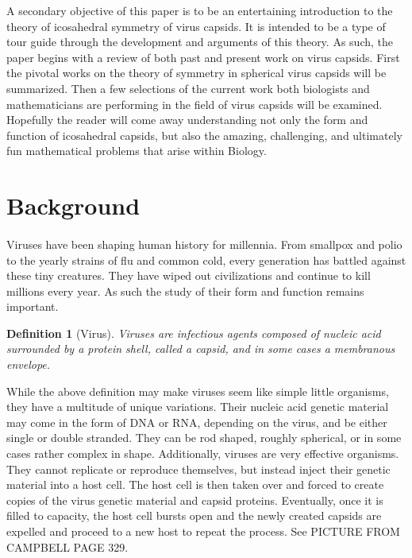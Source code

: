 \documentclass[12pt,letter]{article}
\newtheorem*{definition*}{Definition}
\begin{document}
A secondary objective of this paper is to be an entertaining introduction to the theory of icosahedral symmetry of virus capsids. It is intended to be a type of tour guide through the development and arguments of this theory. As such, the paper begins with a review of both past and present work on virus capsids. First the pivotal works on the theory of symmetry in spherical virus capsids will be summarized. Then a few selections of the current work both biologists and mathematicians are performing in the field of virus capsids will be examined. Hopefully the reader will come away understanding not only the form and function of icosahedral capsids, but also the amazing, challenging, and ultimately fun mathematical problems that arise within Biology. \\

\section{Background} %

\paragraph{}
Viruses have been shaping human history for millennia. From smallpox and polio to the yearly strains of flu and common cold, every generation has battled against these tiny creatures. They have wiped out civilizations and continue to kill millions every year. As such the study of their form and function remains important.

\begin{definition*}[Virus]
Viruses are infectious agents composed of nucleic acid surrounded by a protein shell, called a capsid, and in some cases a membranous envelope. 
\end{definition*}
While the above definition may make viruses seem like simple little organisms, they have a multitude of unique variations. Their nucleic acid genetic material may come in the form of DNA or RNA, depending on the virus, and be either single or double stranded. They can be rod shaped, roughly spherical, or in some cases rather complex in shape. Additionally, viruses are very effective organisms. They cannot replicate or reproduce themselves, but instead inject their genetic material into a host cell. The host cell is then taken over and forced to create copies of the virus genetic material and capsid proteins. Eventually, once it is filled to capacity, the host cell bursts open and the newly created capsids are expelled and proceed to a new host to repeat the process. \cite{Campbell:2002} See PICTURE FROM CAMPBELL PAGE 329. \\
\end{document}
